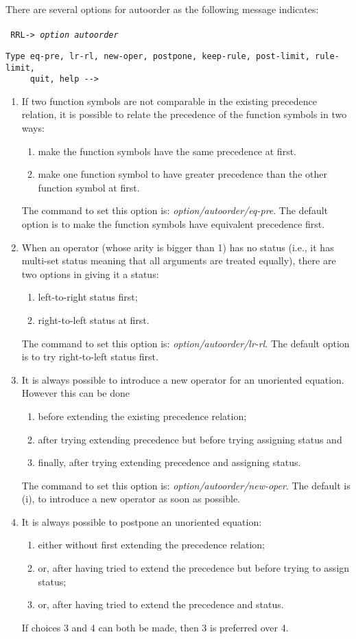 There are several options for
autoorder as the following message indicates:\\ \\
\tt
RRL-> {\em option autoorder}
\begin{verbatim}
Type eq-pre, lr-rl, new-oper, postpone, keep-rule, post-limit, rule-limit, 
     quit, help --> 
\end{verbatim}
\rm
\begin{enumerate}
\item If two function symbols are not comparable
in the existing precedence relation, it is possible
to relate the precedence of the function symbols in two ways:
\begin{enumerate}
\item make the function symbols have the same precedence at first.
\item make one function symbol to have greater precedence than
the other function symbol at first.
\end{enumerate}
The command to set this option is: {\em option/autoorder/eq-pre}.
The default option is to make the function symbols have equivalent
precedence first.
\item When an operator (whose arity is bigger than 1) has no status (i.e.,
it has multi-set status meaning that all arguments are treated equally),
there are two options in giving it a status: 
\begin{enumerate} 
\item left-to-right
status first;
\item right-to-left status at first.
\end{enumerate}
The command to set this option is: {\em option/autoorder/lr-rl}.
The default option is to try right-to-left status first.
\item It is always possible to introduce a new operator for
an unoriented equation. However this can be done
\begin{enumerate}
\item before extending the existing
precedence relation; 
\item after trying extending 
precedence but before trying assigning status and
\item finally, after trying extending precedence and assigning status.
\end{enumerate}
The command to set this option is: {\em option/autoorder/new-oper}.
The default is (i), to introduce a new operator as soon as possible.
\item 
It is always possible to postpone an unoriented equation:
\begin{enumerate}
\item either without first extending the precedence relation; 
\item or, after having tried to extend the precedence but before trying to
assign status; 
\item or, after having tried to extend the precedence
and status. 
\end{enumerate}  
If choices 3 and 4 can both be made, then 3 is preferred
over 4.


\end{enumerate}
